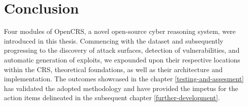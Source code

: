 \documentclass[../main.tex]{subfiles}
\begin{document}
\hypertarget{conclusion}{%
\chapter{Conclusion}\label{conclusion}}

Four modules of OpenCRS, a novel open-source cyber reasoning system,
were introduced in this thesis. Commencing with the dataset and
subsequently progressing to the discovery of attack surfaces, detection
of vulnerabilities, and automatic generation of exploits, we expounded
upon their respective locations within the CRS, theoretical foundations,
as well as their architecture and implementation. The outcomes showcased
in the chapter \ref{testing-and-assesment} has validated the adopted
methodology and have provided the impetus for the action items
delineated in the subsequent chapter \ref{further-development}.
\end{document}
